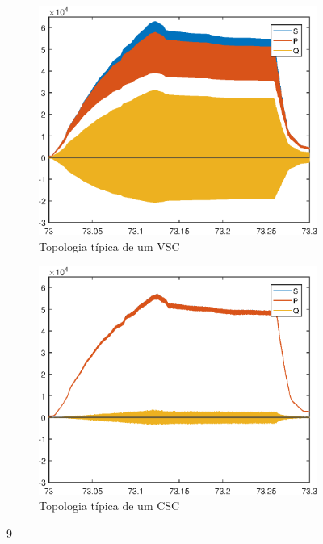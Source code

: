 \begin{figure}[!htb] %
	\centering
	\begin{subfigure}[b]{0.48\textwidth}
		\centering
		\includegraphics[width=\textwidth]{Cap4/Figuras/resultados_unfilt_9.eps}
		\caption{Topologia típica de um VSC} 
		\label{fig:resultados_unfilt_9.eps}
	\end{subfigure}%
		\hfill
	\begin{subfigure}[b]{0.48\textwidth}  
		\centering 
		\includegraphics[width=\textwidth]{Cap4/Figuras/resultados_filt_9.eps}
		\caption{Topologia típica de um CSC}    
		\label{fig:resultados_filt_9.eps}
	\end{subfigure}%
	\caption{9}
	\label{fig:9}
\end{figure}

